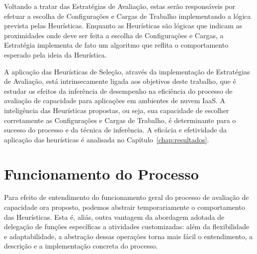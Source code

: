 Voltando a tratar das Estratégias de Avaliação, estas serão responsáveis por efetuar
a escolha de Configurações e Cargas de Trabalho implementando a lógica prevista pelas
Heurísticas. Enquanto as Heurísticas são lógicas que indicam as proximidades onde 
deve ser feita a escolha de Configurações e Cargas, a Estratégia implementa de fato
um algoritmo que reflita o comportamento esperado pela ideia da Heurística.
 
A aplicação das Heurísticas de Seleção, através da implementação de Estratégias 
de Avaliação, está intrinsecamente ligada aos objetivos deste trabalho, que é estudar 
os efeitos da inferência de desempenho na eficiência do processo de avaliação de 
capacidade para aplicações em ambientes de nuvem IaaS. A inteligência 
das Heurísticas propostas, ou seja, sua capacidade de escolher corretamente as 
Configurações e Cargas de Trabalho, é determinante para o sucesso do processo e 
da técnica de inferência. A eficácia e efetividade da aplicação das heurísticas
é analisada no Capítulo~\ref{chap:resultados}. 

\section{Funcionamento do Processo}
\label{sec:funcionamento_processo}
Para efeito de entendimento do funcionamento geral do processo de avaliação de 
capacidade ora proposto, podemos abstrair temporariamente o comportamento das 
Heurísticas. Esta é, aliás, outra vantagem da abordagem adotada de 
delegação de funções específicas a atividades customizadas: além da flexibilidade e 
adaptabilidade, a abstração dessas operações torna mais fácil o entendimento, 
a descrição e a implementação concreta do processo.

